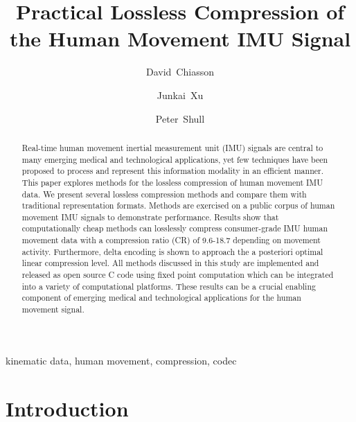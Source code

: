 \documentclass[journal]{IEEEtran}
\begin{document}
\title{Practical Lossless Compression of the Human Movement IMU Signal}

\author[1]{David~Chiasson}
\author[1]{Junkai~Xu}
\author[1]{Peter~Shull}

\maketitle

\begin{abstract}
Real-time human movement inertial measurement unit (IMU) signals are central to many emerging medical and technological applications, yet few techniques have been proposed to process and represent this information modality in an efficient manner. This paper explores methods for the lossless compression of human movement IMU data. We present several lossless compression methods and compare them with traditional representation formats. Methods are exercised on a public corpus of human movement IMU signals to demonstrate performance. Results show that computationally cheap methods can losslessly compress consumer-grade IMU human movement data with a compression ratio (CR) of 9.6-18.7 depending on movement activity. Furthermore, delta encoding is shown to approach the a posteriori optimal linear compression level. All methods discussed in this study are implemented and released as open source C code using fixed point computation which can be integrated into a variety of computational platforms. These results can be a crucial enabling component of emerging medical and technological applications for the human movement signal.
\end{abstract}

\begin{IEEEkeywords}
kinematic data, human movement, compression, codec
\end{IEEEkeywords}



\section{Introduction}
\end{document}
